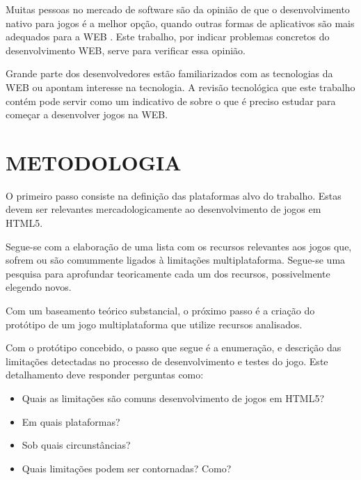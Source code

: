 Muitas pessoas no mercado de software são da opinião de que o
desenvolvimento nativo para jogos é a melhor opção, quando outras
formas de aplicativos são mais adequados para a WEB \cite[p.
21]{aSeriousContender}. Este trabalho, por indicar problemas concretos
do desenvolvimento WEB, serve para verificar essa opinião.

Grande parte dos desenvolvedores estão familiarizados com as
tecnologias da WEB ou apontam interesse na tecnologia. A revisão
tecnológica que este trabalho contém pode servir como um indicativo
de sobre o que é preciso estudar para começar a desenvolver jogos na
WEB.

\section{METODOLOGIA}
\thispagestyle{myheadings}

O primeiro passo consiste na definição das plataformas alvo do trabalho.
Estas devem ser relevantes mercadologicamente ao desenvolvimento de
jogos em HTML5.

Segue-se com a elaboração de uma lista com os recursos relevantes
aos jogos que, sofrem ou são comummente ligados à
limitações multiplataforma. Segue-se uma pesquisa para aprofundar
teoricamente cada um dos recursos, possivelmente elegendo novos.

Com um baseamento teórico substancial, o próximo passo é a criação
do protótipo de um jogo multiplataforma que utilize recursos
analisados.

Com o protótipo concebido, o passo que segue é a enumeração, e
descrição das limitações detectadas no processo de desenvolvimento e
testes do jogo. Este detalhamento deve responder perguntas como:

\begin{itemize}
\item Quais as limitações são comuns desenvolvimento de jogos em HTML5?
\item Em quais plataformas?
\item Sob quais circunstâncias?
\item Quais limitações podem ser contornadas? Como?
\end{itemize}

